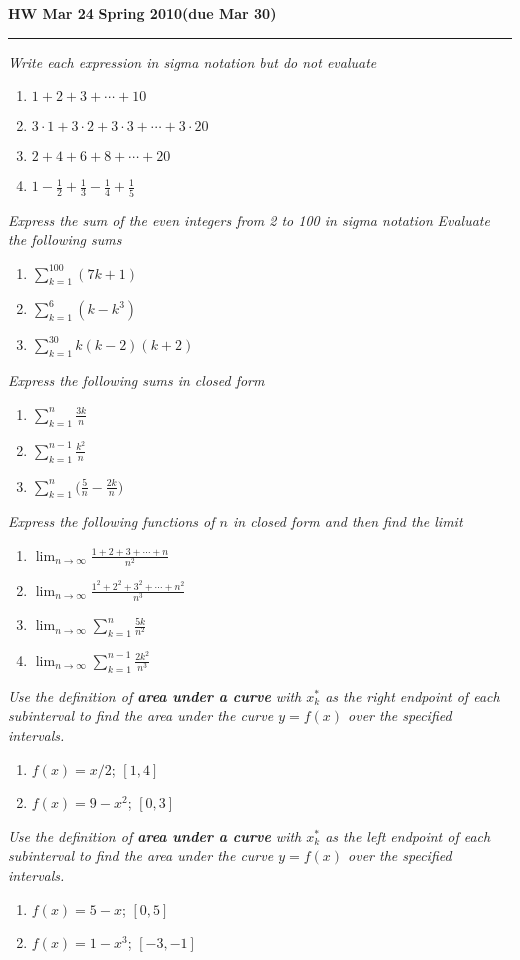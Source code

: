 \documentclass[12pt]{amsart}
\begin{document}
\hfill{\large\bf HW Mar 24}\hfill{\large\bf
  Spring 2010}\hfill{\large\bf (due Mar 30)}\hrule

\bigskip
{\problem \em Write each expression in sigma notation but do not evaluate}
\begin{enumerate}
\item $1+2+3+\dotsb+10$
\item $3\cdot1 + 3 \cdot 2 + 3\cdot 3 + \dotsb +3 \cdot 20$
\item $2+4+6+8+ \dotsb + 20$
\item $1- \tfrac{1}{2} + \tfrac{1}{3} - \tfrac{1}{4} +\tfrac{1}{5}$
\end{enumerate}
{\problem \em Express the sum of the even integers from 2 to 100 in sigma notation}
{\problem \em Evaluate the following sums}
\begin{enumerate}
\item $\displaystyle{\sum_{k=1}^{100} (7k+1)}$
\item $\displaystyle{\sum_{k=1}^{6} (k-k^3)}$
\item $\displaystyle{\sum_{k=1}^{30} k(k-2)(k+2)}$
\end{enumerate}
{\problem \em Express the following sums in closed form}
\begin{enumerate}
\item $\displaystyle{\sum_{k=1}^{n} \frac{3k}{n}}$
\item $\displaystyle{\sum_{k=1}^{n-1} \frac{k^2}{n}}$
\item $\displaystyle{\sum_{k=1}^{n} \bigg( \frac{5}{n} - \frac{2k}{n} \bigg)}$
\end{enumerate}
{\problem \em Express the following functions of $n$ in closed form and then find the limit}
\begin{enumerate}
\item $\displaystyle{\lim_{n \to \infty} \frac{1+2+3+ \dotsb+n}{n^2}}$
\item $\displaystyle{\lim_{n \to \infty} \frac{1^2+2^2+3^2+ \dotsb+n^2}{n^3}}$
\item $\displaystyle{\lim_{n \to \infty} \sum_{k=1}^n \frac{5k}{n^2}}$
\item $\displaystyle{\lim_{n \to \infty} \sum_{k=1}^{n-1} \frac{2k^2}{n^3}}$
\end{enumerate}
{\problem \em Use the definition of \textbf{area under a curve} with
  $x_k^\ast$ as the {\em right} endpoint of each subinterval to find
  the area under the curve $y=f(x)$ over the specified intervals.} 
\begin{enumerate}
\item $f(x) = x/2$; $[1,4]$
\item $f(x) = 9-x^2$; $[0,3]$
\end{enumerate}
{\problem \em Use the definition of \textbf{area under a curve} with
  $x_k^\ast$ as the {\em left} endpoint of each subinterval to find
  the area under the curve $y=f(x)$ over the specified intervals.} 
\begin{enumerate}
\item $f(x) = 5-x$; $[0,5]$
\item $f(x) = 1-x^3$; $[-3,-1]$
\end{enumerate}
\end{document}
